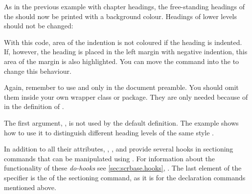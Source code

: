 \begin{Example}
  As in the previous example with chapter headings, the free-standing headings
  of the   should now be printed with a
  background colour. Headings of lower levels should not be changed:
\begin{lstcode}
  \makeatletter
  \renewcommand{\sectionlinesformat}[4]{%
    \@tempswafalse
    \ifstr{#1}{section}{%
      \hspace*{#2}%
      \colorbox{yellow}{%
        \parbox{\dimexpr\linewidth-2\fboxrule-2\fboxsep-#2}{%
          \raggedsection
          \@hangfrom{#3}{#4}%
        }%
      }%
    }{%
      \@hangfrom{\hskip #2#3}{#4}%
    }%
  }
  \makeatother
\end{lstcode}
  With this code, area of the indention is not coloured if the heading is
  indented. If, however, the heading is placed in the left margin with
  negative indention, this area of the margin is also highlighted. You can
  move the  command into the  to change this
  behaviour.

  Again, remember to use  and  only in
  the document preamble. You should omit them inside your own wrapper class or
  package. They are only needed because of  in the definition
  of .
\end{Example}

The first argument, , is not used by the default definition. The
example shows how to use it to distinguish different heading levels of the
same style .%
\EndIndexGroup


\begin{Declaration}
%
%
%
%
%
%
\end{Declaration}
%
In addition to all their attributes,
,
,
 and
 provide several hooks in
sectioning commands that can be manipulated using
. For information about the functionality of
these \emph{do-hooks} see \autoref{sec:scrbase.hooks},
. The last element of the specifier is the
 of the sectioning command, as it is for the declaration commands
mentioned above.


